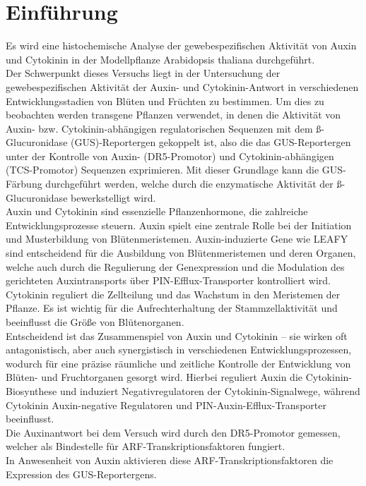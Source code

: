\documentclass[10pt,a4paper]{article}
\begin{document}
	\tableofcontents
	
	\section{Einführung}	
	Es wird eine histochemische Analyse der gewebespezifischen Aktivität von Auxin und Cytokinin in der Modellpflanze Arabidopsis thaliana durchgeführt. \\
	Der Schwerpunkt dieses Versuchs liegt in der Untersuchung der gewebespezifischen Aktivität der Auxin- und Cytokinin-Antwort in verschiedenen Entwicklungsstadien von Blüten und Früchten zu bestimmen. Um dies zu beobachten werden transgene Pflanzen verwendet, in denen die Aktivität von Auxin- bzw. Cytokinin-abhängigen regulatorischen Sequenzen mit dem ß-Glucuronidase (GUS)-Reportergen gekoppelt ist, also die das GUS-Reportergen unter der Kontrolle von Auxin- (DR5-Promotor) und Cytokinin-abhängigen (TCS-Promotor) Sequenzen exprimieren. Mit dieser Grundlage kann die GUS-Färbung durchgeführt werden, welche durch die enzymatische Aktivität der ß-Glucuronidase bewerkstelligt wird. \\
	Auxin und Cytokinin sind essenzielle Pflanzenhormone, die zahlreiche Entwicklungsprozesse steuern. Auxin spielt eine zentrale Rolle bei der Initiation und Musterbildung von Blütenmeristemen. Auxin-induzierte Gene wie LEAFY sind entscheidend für die Ausbildung von Blütenmeristemen und deren Organen, welche auch durch die Regulierung der Genexpression und die Modulation des gerichteten Auxintransports über PIN-Efflux-Transporter kontrolliert wird. Cytokinin reguliert die Zellteilung und das Wachstum in den Meristemen der Pflanze. Es ist wichtig für die Aufrechterhaltung der Stammzellaktivität und beeinflusst die Größe von Blütenorganen. \\
	Entscheidend ist das Zusammenspiel von Auxin und Cytokinin – sie wirken oft antagonistisch, aber auch synergistisch in verschiedenen Entwicklungsprozessen, wodurch für eine präzise räumliche und zeitliche Kontrolle der Entwicklung von Blüten- und Fruchtorganen gesorgt wird. Hierbei reguliert Auxin die Cytokinin-Biosynthese und induziert Negativregulatoren der Cytokinin-Signalwege, während Cytokinin Auxin-negative Regulatoren und PIN-Auxin-Efflux-Transporter beeinflusst. \\
	Die Auxinantwort bei dem Versuch wird durch den DR5-Promotor gemessen, welcher als Bindestelle für ARF-Transkriptionsfaktoren fungiert. \\
	In Anwesenheit von Auxin aktivieren diese ARF-Transkriptionsfaktoren die Expression des GUS-Reportergens. \\
\end{document}
